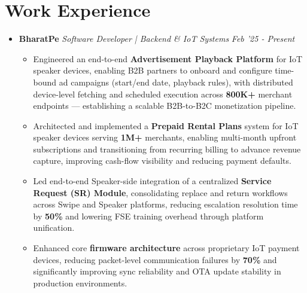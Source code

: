 \documentclass[letterpaper,11pt]{article}
\begin{document}
\section{Work Experience}
    \begin{itemize}[leftmargin=0.15in] 
        \item{\textbf{BharatPe}}\hspace{15.4cm}{Cybercity}
\textit{Software Developer | Backend \& IoT Systems}
\hspace{8.4cm}\textit{Feb '25 - Present}
        \vspace{-6pt}
       \begin{itemize}[leftmargin=0.2in]     
\item[$\circ$] {Engineered an end-to-end \textbf{Advertisement Playback Platform} for IoT speaker devices, enabling B2B partners to onboard and configure time-bound ad campaigns (start/end date, playback rules), with distributed device-level fetching and scheduled execution across \textbf{800K+} merchant endpoints — establishing a scalable B2B-to-B2C monetization pipeline.}
\vspace{-2pt}

\item[$\circ$] {Architected and implemented a \textbf{Prepaid Rental Plans} system for IoT speaker devices serving \textbf{1M+} merchants, enabling multi-month upfront subscriptions and transitioning from recurring billing to advance revenue capture, improving cash-flow visibility and reducing payment defaults.}
\vspace{-2pt}

\item[$\circ$] {Led end-to-end Speaker-side integration of a centralized \textbf{Service Request (SR) Module}, consolidating replace and return workflows across Swipe and Speaker platforms, reducing escalation resolution time by \textbf{50\%} and lowering FSE training overhead through platform unification.}

\vspace{-2pt}

\item[$\circ$] {Enhanced core \textbf{firmware architecture} across proprietary IoT payment devices, reducing packet-level communication failures by \textbf{70\%} and significantly improving sync reliability and OTA update stability in production environments.}



\end{itemize}
\end{itemize}
\end{document}
